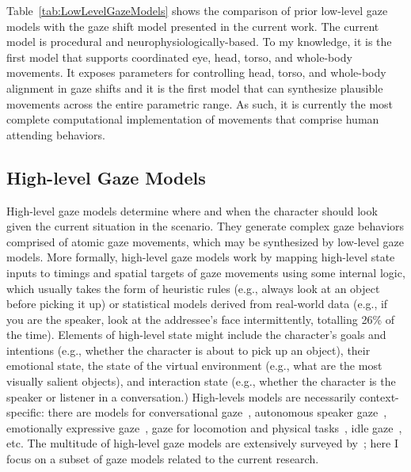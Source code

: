 Table~\ref{tab:LowLevelGazeModels} shows the comparison of prior low-level gaze models with the gaze shift model presented in the current work. The current model is procedural and neurophysiologically-based. To my knowledge, it is the first model that supports coordinated eye, head, torso, and whole-body movements. It exposes parameters for controlling head, torso, and whole-body alignment in gaze shifts and it is the first model that can synthesize plausible movements across the entire parametric range. %
As such, it is currently the most complete computational implementation of movements that comprise human attending behaviors.

\subsection{High-level Gaze Models}

High-level gaze models determine where and when the character should look given the current situation in the scenario. They generate complex gaze behaviors comprised of atomic gaze movements, which may be synthesized by low-level gaze models. More formally, high-level gaze models work by mapping high-level state inputs to timings and spatial targets of gaze movements using some internal logic, which usually takes the form of heuristic rules (e.g., always look at an object before picking it up) or statistical models derived from real-world data (e.g., if you are the speaker, look at the addressee's face intermittently, totalling 26\% of the time). Elements of high-level state might include the character's goals and intentions (e.g., whether the character is about to pick up an object), their emotional state, the state of the virtual environment (e.g., what are the most visually salient objects), and interaction state (e.g., whether the character is the speaker or listener in a conversation.) High-levels models are necessarily context-specific: there are models for conversational gaze~\citep{pelachaud2003modelling,masuko2007headeye,gratch2007rapport,andrist2013aversion,lee2007rickel}, autonomous speaker gaze~\citep{bee2010gaze,zoric2011oncreating,marsella2013virtual}, emotionally expressive gaze~\citep{queiroz2007automatic,lance2010expressive,li2012emotional}, gaze for locomotion and physical tasks~\citep{khullar2001look,mitake2007reactive,huang2016planning}, idle gaze~\citep{khullar2001look,peters2003bottomup,mitake2007reactive,peters2008applying,cafaro2009animating,grillon2009crowds,kokkinara2011modelling}, etc. The multitude of high-level gaze models are extensively surveyed by~\citet{ruhland2015gazereview}; here I focus on a subset of gaze models related to the current research.

